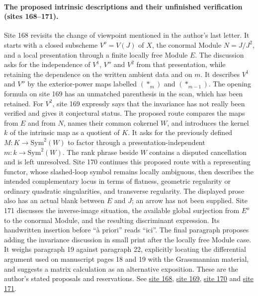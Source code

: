 \paragraph{The proposed intrinsic descriptions and their unfinished verification (sites 168--171).}
Site 168 revisits the change of viewpoint mentioned in the author's last letter. It starts with a closed subscheme $V^o=V(J)$ of $X$, the conormal Module $N=J/J^2$, and a local presentation through a finite locally free Module $E$. The discussion asks for the independence of $V^1$, $V''$ and $V^2$ from that presentation, while retaining the dependence on the written ambient data and on $m$. It describes $V^1$ and $V''$ by the exterior-power maps labelled $(*_m)$ and $(*_{m-1})$. The opening formula on site 169 has an unmatched parenthesis in the scan, which has been retained. For $V^2$, site 169 expressly says that the invariance has not really been verified and gives it conjectural status. The proposed route compares the maps from $E$ and from $N$, names their common cokernel $W$, and introduces the kernel $k$ of the intrinsic map as a quotient of $K$. It asks for the previously defined $M:K\to\mathrm{Sym}^2(W)$ to factor through a presentation-independent $m:k\to\mathrm{Sym}^2(W)$. The rank phrase beside $W$ contains a disputed cancellation and is left unresolved. Site 170 continues this proposed route with a representing functor, whose slashed-loop symbol remains locally ambiguous, then describes the intended complementary locus in terms of flatness, geometric regularity or ordinary quadratic singularities, and transverse regularity. The displayed prose also has an actual blank between $E$ and $J$; an arrow has not been supplied. Site 171 discusses the inverse-image situation, the available global surjection from $E^o$ to the conormal Module, and the resulting discriminant expression. Its handwritten insertion before ``à priori'' reads ``ici''. The final paragraph proposes adding the invariance discussion in small print after the locally free Module case. It weighs paragraph 19 against paragraph 22, explicitly locating the differential argument used on manuscript pages 18 and 19 with the Grassmannian material, and suggests a matrix calculation as an alternative exposition. These are the author's stated proposals and reservations. See \href{https://grothendieck.umontpellier.fr/web/viewer.html?file=../25.pdf#page=169}{site 168}, \href{https://grothendieck.umontpellier.fr/web/viewer.html?file=../25.pdf#page=170}{site 169}, \href{https://grothendieck.umontpellier.fr/web/viewer.html?file=../25.pdf#page=171}{site 170} and \href{https://grothendieck.umontpellier.fr/web/viewer.html?file=../25.pdf#page=172}{site 171}.
